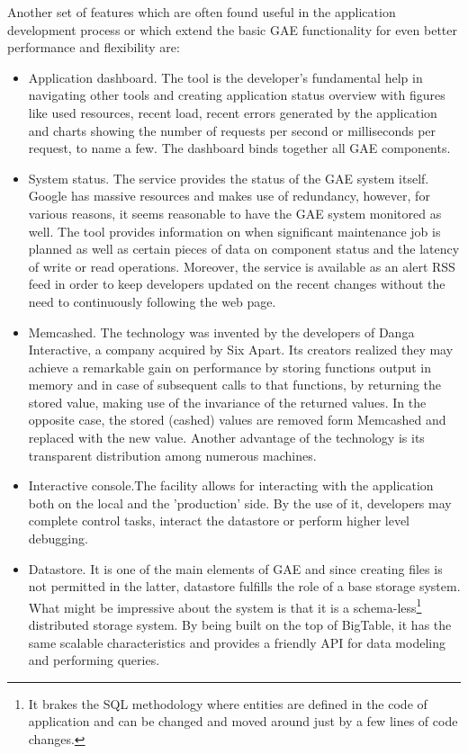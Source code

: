 Another set of features which are often found useful in the application development process or which extend the basic GAE functionality for even better performance and flexibility are:
\begin{itemize}
\item{Application dashboard. The tool is the developer's fundamental help in navigating other tools and creating application status overview with figures like used resources, recent load, recent errors generated by the application and charts showing the number of requests per second or milliseconds per request, to name a few. The dashboard binds together all GAE components.}
\item{System status. The service provides the status of the GAE system itself. Google has massive resources and makes use of redundancy, however, for various reasons, it seems reasonable to have the GAE system monitored as well. The tool provides information on when significant maintenance job is planned as well as certain pieces of data on component status and the latency of write or read operations. Moreover, the service is available as an alert RSS feed in order to keep developers updated on the recent changes without the need to continuously following the web page.}
\item{Memcashed. The technology was invented by the developers of Danga Interactive, a company acquired by Six Apart. Its creators realized they may achieve a remarkable gain on performance by storing functions output in memory and in case of subsequent calls to that functions, by returning the stored value, making use of the invariance of the returned values. In the opposite case, the stored (cashed) values are removed form Memcashed and replaced with the new value. Another advantage of the technology is its transparent distribution among numerous machines.} 
\item{Interactive console.The facility allows for interacting with the application both on the local and the 'production' side. By the use of it, developers may complete control tasks, interact the datastore or perform higher level debugging.}
\item{Datastore}. It is one of the main elements of GAE and since creating files is not permitted in the latter, datastore fulfills the role of a base storage system. What might be impressive about the system is that it is a schema-less\footnote{It brakes the SQL methodology where entities are defined in the code of application and can be changed and moved around just by a few lines of code changes.} distributed storage system. By being built on the top of BigTable, it has the same scalable characteristics and provides a friendly API for data modeling and performing queries. 

\end{itemize}
